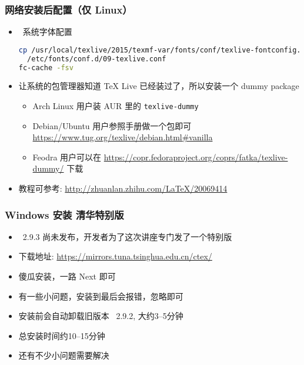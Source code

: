 \begin{frame}[fragile]
  \frametitle{网络安装后配置（仅 Linux）}
  \begin{itemize}
  \item
    \XeTeX\ 系统字体配置
    \begin{lstlisting}[language=bash]
cp /usr/local/texlive/2015/texmf-var/fonts/conf/texlive-fontconfig.conf \
  /etc/fonts/conf.d/09-texlive.conf
fc-cache -fsv
    \end{lstlisting}
  \item 让系统的包管理器知道 TeX Live 已经装过了，所以安装一个 dummy package
    \begin{itemize}
      \item Arch Linux 用户装 AUR 里的 \verb|texlive-dummy|
      \item Debian/Ubuntu 用户参照手册做一个包即可 
        \url{https://www.tug.org/texlive/debian.html\#vanilla}
      \item Feodra 用户可以在
        \url{https://copr.fedoraproject.org/coprs/fatka/texlive-dummy/} 下载
    \end{itemize}
  \item 教程可参考: \url{http://zhuanlan.zhihu.com/LaTeX/20069414}
  \end{itemize}
\end{frame}

\begin{frame}[fragile]
  \frametitle{Windows 安装 \CTeX 清华特别版}
  \begin{itemize}
    \item \CTeX~2.9.3 尚未发布，开发者为了这次讲座专门发了一个特别版
    \item 下载地址: {\small\url{https://mirrors.tuna.tsinghua.edu.cn/ctex/}}
    \item 傻瓜安装，一路 Next 即可
    \item 有一些小问题，安装到最后会报错，忽略即可
    \item 安装前会自动卸载旧版本 \CTeX~2.9.2, 大约3--5分钟
    \item 总安装时间约10--15分钟
    \item 还有不少小问题需要解决
  \end{itemize}
\end{frame}

